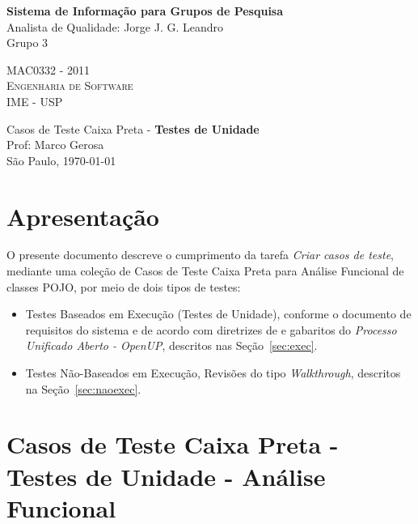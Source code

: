 \documentclass[11pt, a4paper]{book}
\begin{document}
\thispagestyle{empty}
\begin{center}
    \vspace*{0.2cm}
    \textbf{\Large{Sistema de Informação para Grupos de Pesquisa}}\\
	
    \vspace*{1.2cm}
    \Large{Analista de Qualidade: Jorge J. G. Leandro}\\
    \Large{Grupo 3}
    
    \vskip 2cm
	\textsc{
	MAC0332 - 2011\\[-0.25cm] 
          	Engenharia de Software\\[-0.25cm] 	
	IME - USP\\[-0.25cm]
	}
    
    \vskip 1.5cm
    Casos de Teste Caixa Preta - \textbf{Testes de Unidade}\\
    Prof: Marco Gerosa\\

	
    \vskip 0.5cm
   {\normalsize São Paulo, \today}
\end{center}


\chapter[Apresentação]{Apresentação}
\label{cap:apresentacao}	
	
	 	O presente documento descreve o cumprimento da tarefa \emph{Criar casos de teste}, mediante uma coleção de Casos de Teste Caixa Preta para Análise Funcional de classes POJO, por meio de dois tipos de testes:

\begin{itemize}
 \item Testes Baseados em Execução (Testes de Unidade), conforme o documento de requisitos do sistema e de acordo com diretrizes de \citep{schach2007} e gabaritos do \emph{Processo Unificado Aberto - OpenUP}, descritos nas Seção~\ref{sec:exec}.

\item Testes Não-Baseados em Execução, Revisões do tipo \emph{Walkthrough}, descritos na Seção~\ref {sec:naoexec}.

\end{itemize}

\chapter[Casos de Teste]{Casos de Teste Caixa Preta - Testes de Unidade - Análise Funcional}
\label{cap:casosdeteste}
\end{document}
